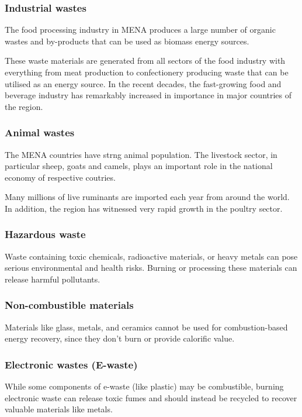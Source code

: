 \documentclass{article}
\begin{document}
\subsubsection{Industrial wastes}
The food processing industry in MENA produces a large number of organic wastes and
by-products that can be used as biomass energy sources.

These waste materials are generated from all sectors of the food industry
with everything from meat production to confectionery producing waste that can be utilised
as an energy source. In the recent decades, the fast-growing food and beverage
industry has remarkably increased in importance in major countries of the region.

\subsubsection{Animal wastes}
The MENA countries have strng animal population. The livestock sector, in particular
sheep, goats and camels, plays an important role in the national economy
of respective coutries.

Many millions of live ruminants are imported each year from around the world.
In addition, the region has witnessed very rapid growth in the poultry sector.

\subsubsection{Hazardous waste}
Waste containing toxic chemicals, radioactive materials, or heavy metals can pose serious
environmental and health risks. Burning or processing these materials
can release harmful pollutants.

\subsubsection{Non-combustible materials}
Materials like glass, metals, and ceramics cannot be used for combustion-based
energy recovery, since they don't burn or provide calorific value.

\subsubsection{Electronic wastes (E-waste)}
While some components of e-waste (like plastic) may be combustible, burning electronic
waste can release toxic fumes and should instead be recycled to recover valuable materials like metals.
\end{document}
